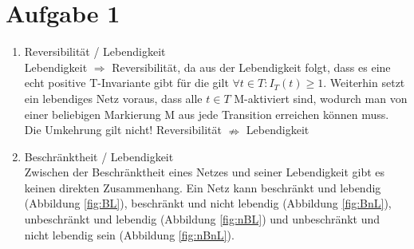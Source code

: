 \documentclass[10pt]{scrartcl}
\author{Carsten Noetzel, Armin Steudte}
\title{\titletext}
\date{16.05.2012}
\begin{document}
\maketitle

\setcounter{tocdepth}{3}
\tableofcontents
\listoffigures

\section{Aufgabe 1}
\begin{enumerate}
\item{Reversibilität / Lebendigkeit}\\
Lebendigkeit $\Rightarrow$ Reversibilität, da aus der Lebendigkeit folgt, dass es eine echt positive T-Invariante gibt für die gilt $\forall t \in T : I_{T}(t) \geq 1$. Weiterhin setzt ein lebendiges Netz voraus, dass alle $t \in T$  M-aktiviert sind, wodurch man von einer beliebigen Markierung M aus jede Transition erreichen können muss.\\
Die Umkehrung gilt nicht! Reversibilität $\nRightarrow$ Lebendigkeit

\item{Beschränktheit / Lebendigkeit}\\
Zwischen der Beschränktheit eines Netzes und seiner Lebendigkeit gibt es keinen direkten Zusammenhang. Ein Netz kann beschränkt und lebendig (Abbildung \ref{fig:BL}), beschränkt und nicht lebendig (Abbildung \ref{fig:BnL}), unbeschränkt und lebendig (Abbildung \ref{fig:nBL}) und unbeschränkt und nicht lebendig sein (Abbildung \ref{fig:nBnL}).


\end{enumerate}
\end{document}
